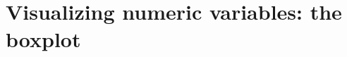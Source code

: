 \documentclass[]{book}\usepackage[]{graphicx}\usepackage[]{color}
\begin{document}
% 
% 
% 
% 
%


\section{Visualizing numeric variables: the boxplot}
\end{document}
